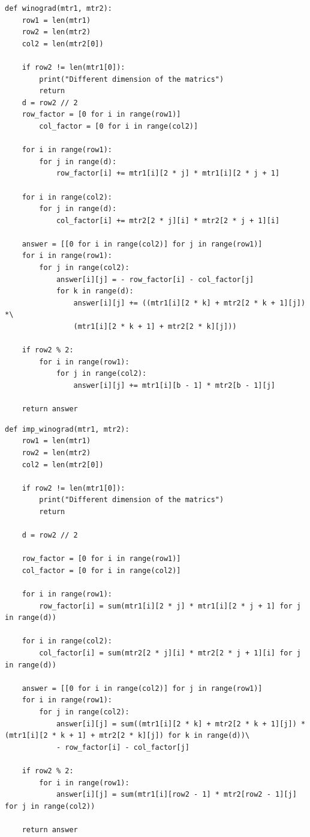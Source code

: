 \documentclass[12pt]{report}
\begin{document}
\begin{lstlisting}[label=winograd_mult,caption=Алгоритм Винограда]
def winograd(mtr1, mtr2):
	row1 = len(mtr1)
	row2 = len(mtr2)
	col2 = len(mtr2[0])

	if row2 != len(mtr1[0]):
		print("Different dimension of the matrics")
		return
	d = row2 // 2
	row_factor = [0 for i in range(row1)]
		col_factor = [0 for i in range(col2)]

	for i in range(row1):
		for j in range(d):
			row_factor[i] += mtr1[i][2 * j] * mtr1[i][2 * j + 1]

	for i in range(col2):
		for j in range(d):
			col_factor[i] += mtr2[2 * j][i] * mtr2[2 * j + 1][i]

	answer = [[0 for i in range(col2)] for j in range(row1)]
	for i in range(row1):
		for j in range(col2):
			answer[i][j] = - row_factor[i] - col_factor[j]
			for k in range(d):
				answer[i][j] += ((mtr1[i][2 * k] + mtr2[2 * k + 1][j]) *\
				(mtr1[i][2 * k + 1] + mtr2[2 * k][j]))

	if row2 % 2:
		for i in range(row1):
			for j in range(col2):
				answer[i][j] += mtr1[i][b - 1] * mtr2[b - 1][j]

	return answer
\end{lstlisting}

\begin{lstlisting}[label=winograd_opt,caption=Оптимизированный алгорит Винограда]
def imp_winograd(mtr1, mtr2):
	row1 = len(mtr1)
	row2 = len(mtr2)
	col2 = len(mtr2[0])

	if row2 != len(mtr1[0]):
		print("Different dimension of the matrics")
		return

	d = row2 // 2

	row_factor = [0 for i in range(row1)]
	col_factor = [0 for i in range(col2)]

	for i in range(row1):
		row_factor[i] = sum(mtr1[i][2 * j] * mtr1[i][2 * j + 1] for j in range(d))

	for i in range(col2):
		col_factor[i] = sum(mtr2[2 * j][i] * mtr2[2 * j + 1][i] for j in range(d))

	answer = [[0 for i in range(col2)] for j in range(row1)]
	for i in range(row1):
		for j in range(col2):
			answer[i][j] = sum((mtr1[i][2 * k] + mtr2[2 * k + 1][j]) * (mtr1[i][2 * k + 1] + mtr2[2 * k][j]) for k in range(d))\
			- row_factor[i] - col_factor[j]

	if row2 % 2:
		for i in range(row1):
			answer[i][j] = sum(mtr1[i][row2 - 1] * mtr2[row2 - 1][j] for j in range(col2))

	return answer
\end{lstlisting}
\end{document}
